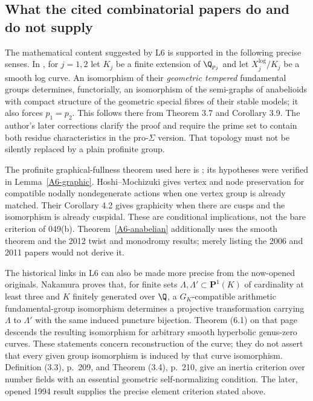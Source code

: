 \subsection{What the cited combinatorial papers do and do not supply}
The mathematical content suggested by L6 is supported in the following precise senses. In \cite[Corollary 3.11]{Mochizuki2006A567}, for $j=1,2$ let $K_j$ be a finite extension of $\Q_{p_j}$ and let $X_j^{\log}/K_j$ be a smooth log curve. An isomorphism of their \emph{geometric tempered} fundamental groups determines, functorially, an isomorphism of the semi-graphs of anabelioids with compact structure of the geometric special fibres of their stable models; it also forces $p_1=p_2$. This follows there from Theorem 3.7 and Corollary 3.9. The author's later corrections \cite[items (2), (3), (6)]{Mochizuki2020CommentsA567} clarify the proof and require the prime set to contain both residue characteristics in the pro-$\Sigma$ version. That topology must not be silently replaced by a plain profinite group.

The profinite graphical-fullness theorem used here is \cite[Corollary 2.7(ii)]{Mochizuki2007A567}; its hypotheses were verified in Lemma~\ref{A6-graphic}. Hoshi--Mochizuki \cite[Theorem 4.1]{HoshiMochizuki2011A567} gives vertex and node preservation for compatible nodally nondegenerate actions when one vertex group is already matched. Their Corollary 4.2 gives graphicity when there are cusps and the isomorphism is already cuspidal. These are conditional implications, not the bare criterion of 049(b). Theorem~\ref{A6-anabelian} additionally uses the smooth theorem and the 2012 twist and monodromy results; merely listing the 2006 and 2011 papers would not derive it.

The historical links in L6 can also be made more precise from the
now-opened originals. Nakamura \cite[Theorem (5.10), p.~215]{Nakamura1990A567}
proves that, for finite sets $\Lambda,\Lambda'\subset\mathbf P^1(K)$
of cardinality at least three and $K$ finitely generated over $\Q$,
a $G_K$-compatible arithmetic fundamental-group isomorphism determines
a projective transformation carrying $\Lambda$ to $\Lambda'$ with
the same induced puncture bijection. Theorem (6.1) on that page descends
the resulting isomorphism for arbitrary smooth hyperbolic genus-zero
curves. These statements concern reconstruction of the curve; they
do not assert that every given group isomorphism is induced by that
curve isomorphism. Definition (3.3), p.~209, and Theorem (3.4), p.~210,
give an inertia criterion over number fields with an essential
geometric self-normalizing condition. The later, opened 1994 result
supplies the precise element criterion stated above.

